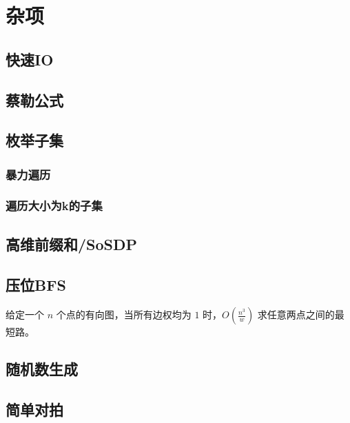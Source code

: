 \documentclass{article}
\begin{document}
\section{杂项}
\subsection{快速IO}

\subsection{蔡勒公式}

\subsection{枚举子集}
\subsubsection{暴力遍历}

\subsubsection{遍历大小为k的子集}

\subsection{高维前缀和/SoSDP}

\subsection{压位BFS}
给定一个 $n$ 个点的有向图，当所有边权均为 $1$ 时，$O(\frac{n^3}{w})$ 求任意两点之间的最短路。

\subsection{随机数生成}

\subsection{简单对拍}

\end{document}
